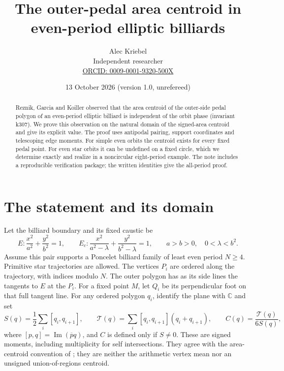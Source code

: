 \documentclass[11pt]{article}
\title{The outer-pedal area centroid in even-period elliptic billiards}
\author{Alec Kriebel\\Independent researcher\\
\small\href{https://orcid.org/0009-0001-9320-500X}{ORCID: 0009-0001-9320-500X}}
\date{13 October 2026 \quad (version 1.0, unrefereed)}
\newcommand{\Ima}{\operatorname{Im}}
\newcommand{\cross}[2]{[#1,#2]}
\begin{document}
\maketitle
\begin{abstract}
Reznik, Garcia and Koiller observed that the area centroid of the outer-side
pedal polygon of an even-period elliptic billiard is independent of the orbit
phase (invariant k307). We prove this observation on the natural domain of the
signed-area centroid and give its explicit value. The proof uses antipodal
pairing, support coordinates and telescoping edge moments. For simple even
orbits the centroid exists for every fixed pedal point. For even star orbits
it can be undefined on a fixed circle, which we determine exactly and realize
in a noncircular eight-period example. The note includes a reproducible
verification package; the written identities give the all-period proof.
\end{abstract}

\section{The statement and its domain}
Let the billiard boundary and its fixed caustic be
\[
 E:\frac{x^2}{a^2}+\frac{y^2}{b^2}=1,\qquad
 E_c:\frac{x^2}{a^2-\lambda}+\frac{y^2}{b^2-\lambda}=1,
 \qquad a>b>0,\quad 0<\lambda<b^2.
\]
Assume this pair supports a Poncelet billiard family of least even period
$N\geq4$. Primitive star trajectories are allowed. The vertices $P_i$ are
ordered along the trajectory, with indices modulo $N$. The outer polygon has
as its side lines the tangents to $E$ at the $P_i$. For a fixed point $M$, let
$Q_i$ be its perpendicular foot on that full tangent line.
For any ordered polygon $q_i$, identify the plane with $\mathbb C$ and set
\begin{equation}\label{signed}
 S(q)=\frac12\sum_i\cross{q_i}{q_{i+1}},\qquad
 \mathcal T(q)=\sum_i\cross{q_i}{q_{i+1}}(q_i+q_{i+1}),\qquad
 C(q)=\frac{\mathcal T(q)}{6S(q)},
\end{equation}
where $\cross{p}{q}=\Ima(\overline p q)$, and $C$ is defined only if $S\ne0$.
These are signed moments, including multiplicity for self intersections.
They agree with the area-centroid convention of \cite{RGK}; they are neither
the arithmetic vertex mean nor an unsigned union-of-regions centroid.
\end{document}
